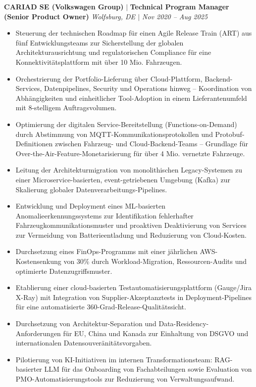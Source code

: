 \documentclass[a4paper,10pt]{article}
\begin{document}
\vspace{6pt}
\textbf{CARIAD SE (Volkswagen Group)} $|$ \textbf{Technical Program Manager (Senior Product Owner)} \hfill \textit{Wolfsburg, DE $|$ Nov 2020 -- Aug 2025}
\begin{itemize}
\item Steuerung der technischen Roadmap f{\"u}r einen Agile Release Train (ART) aus f{\"u}nf Entwicklungsteams zur Sicherstellung der globalen Architekturausrichtung und regulatorischen Compliance f{\"u}r eine Konnektivit{\"a}tsplattform mit {\"u}ber 10 Mio. Fahrzeugen.
\item Orchestrierung der Portfolio-Lieferung {\"u}ber Cloud-Plattform, Backend-Services, Datenpipelines, Security und Operations hinweg -- Koordination von Abh{\"a}ngigkeiten und einheitlicher Tool-Adoption in einem Lieferanten\-umfeld mit 8-stelligem Auftragsvolumen.
\item Optimierung der digitalen Service-Bereitstellung (Functions-on-Demand) durch Abstimmung von MQTT-Kommunikations\-protokollen und Protobuf-Definitionen zwischen Fahrzeug- und Cloud-Backend-Teams -- Grundlage f{\"u}r Over-the-Air-Feature-Monetarisierung f{\"u}r {\"u}ber 4 Mio. vernetzte Fahrzeuge.
\item Leitung der Architekturmigration von monolithischen Legacy-Systemen zu einer Microservice-basierten, event-getriebenen Umgebung (Kafka) zur Skalierung globaler Datenverarbeitungs-Pipelines.
\item Entwicklung und Deployment eines ML-basierten Anomalie\-erkennungssystems zur Identifikation fehlerhafter Fahrzeugkommunikationsmuster und proaktiven Deaktivierung von Services zur Vermeidung von Batterie\-entladung und Reduzierung von Cloud-Kosten.
\item Durchsetzung eines FinOps-Programms mit einer j{\"a}hrlichen AWS-Kostensenkung von 30\% durch Workload-Migration, Ressourcen-Audits und optimierte Datenzugriffsmuster.
\item Etablierung einer cloud-basierten Testautomatisierungsplattform (Gauge/Jira X-Ray) mit Integration von Supplier-Akzeptanztests in Deployment-Pipelines f{\"u}r eine automatisierte 360-Grad-Release-Qualit{\"a}tssicht.
\item Durchsetzung von Architektur-Separation und Data-Residency-Anforderungen f{\"u}r EU, China und Kanada zur Einhaltung von DSGVO und internationalen Datensouver{\"a}nit{\"a}tsvorgaben.
\item Pilotierung von KI-Initiativen im internen Transformationsteam: RAG-basierter LLM f{\"u}r das Onboarding von Fachabteilungen sowie Evaluation von PMO-Automatisierungs\-tools zur Reduzierung von Verwaltungsaufwand.
\end{itemize}
\end{document}
